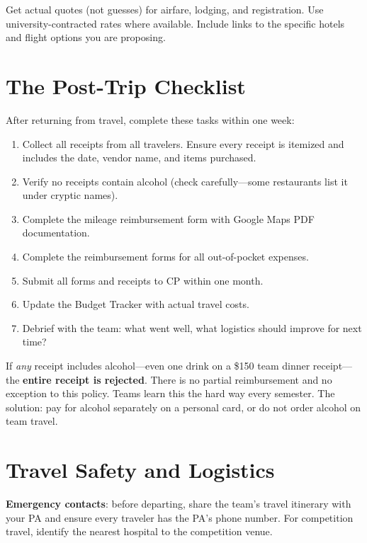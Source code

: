 Get actual quotes (not guesses) for airfare, lodging, and registration. Use university-contracted rates where available. Include links to the specific hotels and flight options you are proposing.

\section{The Post-Trip Checklist}
After returning from travel, complete these tasks within one week:

\begin{enumerate}[nosep,leftmargin=1.5em]
\item Collect all receipts from all travelers. Ensure every receipt is itemized and includes the date, vendor name, and items purchased.
\item Verify no receipts contain alcohol (check carefully---some restaurants list it under cryptic names).
\item Complete the mileage reimbursement form with Google Maps PDF documentation.
\item Complete the reimbursement forms for all out-of-pocket expenses.
\item Submit all forms and receipts to CP within one month.
\item Update the Budget Tracker with actual travel costs.
\item Debrief with the team: what went well, what logistics should improve for next time?
\end{enumerate}

\begin{warningbox}
If \emph{any} receipt includes alcohol---even one drink on a \$150 team dinner receipt---the \textbf{entire receipt is rejected}. There is no partial reimbursement and no exception to this policy. Teams learn this the hard way every semester. The solution: pay for alcohol separately on a personal card, or do not order alcohol on team travel.
\end{warningbox}



\section{Travel Safety and Logistics}
\textbf{Emergency contacts}: before departing, share the team's travel itinerary with your PA and ensure every traveler has the PA's phone number. For competition travel, identify the nearest hospital to the competition venue.


